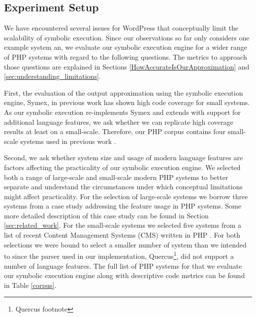 \documentclass[sigconf]{acmart}
\renewcommand{\sf}[1]{\textsf{#1}}
\begin{document}
\subsection{Experiment Setup} \label{sec:experiment_setup}
We have encountered several issues for \sf{WordPress} that conceptually limit
the scalability of symbolic execution. Since our observations so far only considers
one example system an, we evaluate our symbolic execution engine for a wider
range of PHP systems with regard to the following questions. The metrics to
approach those questions are explained in Sections
\ref{HowAccurateIsOurApproximation} and \ref{sec:understanding_limitations}.

First, the evaluation of the output approximation using the symbolic execution
engine, \sf{Symex}, in previous work \cite{Nguyen:2014:BCG:2635868.2635928} has
shown high code coverage for small systems. As our symbolic execution
re-implements \sf{Symex} and extends with support for additional language
features, we ask whether we can replicate high coverage results at least on a small-scale. Therefore, our PHP
corpus contains four small-scale systems used in previous work \cite{Nguyen:2014:BCG:2635868.2635928}.

Second, we ask whether system size and usage of modern language features are
factors affecting the practicality of our symbolic execution engine. We
selected both a range of large-scale and small-scale modern PHP systems to
better separate and understand the circumstances under which conceptual
limitations might affect practicality. For the selection of large-scale systems
we borrow three systems from a case study addressing the feature usage in PHP
systems. Some more detailed description of this case study can be found in
Section \ref{sec:related_work}. For the small-scale systems we selected five systems from
a list of recent Content Management Systems (CMS) written in PHP \cite{codegeekz}. For both
selections we were bound to select a smaller number of system than we intended
to since the parser used in our implementation, \sf{Quercus}\footnote{Quercus
footnote}, did not support a number of language features. The full list of PHP
systems for that we evaluate our symbolic execution engine along with
descriptive code metrics can be found in Table \ref{corpus}.
\end{document}
